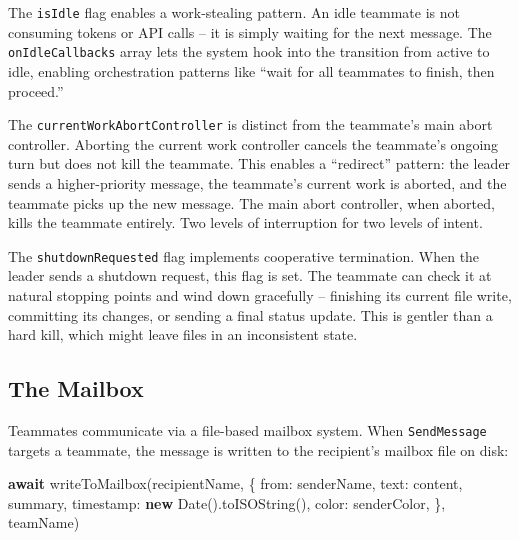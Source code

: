 \documentclass[
  english,
  11pt,
  letterpaper,
]{book}
\newenvironment{Shaded}{\begin{snugshade}}{\end{snugshade}}
\newcommand{\BuiltInTok}[1]{\textcolor[rgb]{0.00,0.23,0.31}{#1}}
\newcommand{\ControlFlowTok}[1]{\textcolor[rgb]{0.00,0.23,0.31}{\textbf{#1}}}
\newcommand{\FunctionTok}[1]{\textcolor[rgb]{0.28,0.35,0.67}{#1}}
\newcommand{\KeywordTok}[1]{\textcolor[rgb]{0.00,0.23,0.31}{\textbf{#1}}}
\newcommand{\NormalTok}[1]{\textcolor[rgb]{0.00,0.23,0.31}{#1}}
\newcommand{\OperatorTok}[1]{\textcolor[rgb]{0.37,0.37,0.37}{#1}}
\begin{document}
The \texttt{isIdle} flag enables a work-stealing pattern. An idle
teammate is not consuming tokens or API calls -- it is simply waiting
for the next message. The \texttt{onIdleCallbacks} array lets the system
hook into the transition from active to idle, enabling orchestration
patterns like ``wait for all teammates to finish, then proceed.''

The \texttt{currentWorkAbortController} is distinct from the teammate's
main abort controller. Aborting the current work controller cancels the
teammate's ongoing turn but does not kill the teammate. This enables a
``redirect'' pattern: the leader sends a higher-priority message, the
teammate's current work is aborted, and the teammate picks up the new
message. The main abort controller, when aborted, kills the teammate
entirely. Two levels of interruption for two levels of intent.

The \texttt{shutdownRequested} flag implements cooperative termination.
When the leader sends a shutdown request, this flag is set. The teammate
can check it at natural stopping points and wind down gracefully --
finishing its current file write, committing its changes, or sending a
final status update. This is gentler than a hard kill, which might leave
files in an inconsistent state.

\subsection{The Mailbox}\label{the-mailbox}

Teammates communicate via a file-based mailbox system. When
\texttt{SendMessage} targets a teammate, the message is written to the
recipient's mailbox file on disk:

\begin{Shaded}
\begin{Highlighting}[]
\ControlFlowTok{await} \FunctionTok{writeToMailbox}\NormalTok{(recipientName}\OperatorTok{,}\NormalTok{ \{}
\NormalTok{  from}\OperatorTok{:}\NormalTok{ senderName}\OperatorTok{,}
\NormalTok{  text}\OperatorTok{:}\NormalTok{ content}\OperatorTok{,}
\NormalTok{  summary}\OperatorTok{,}
\NormalTok{  timestamp}\OperatorTok{:} \KeywordTok{new} \BuiltInTok{Date}\NormalTok{()}\OperatorTok{.}\FunctionTok{toISOString}\NormalTok{()}\OperatorTok{,}
\NormalTok{  color}\OperatorTok{:}\NormalTok{ senderColor}\OperatorTok{,}
\NormalTok{\}}\OperatorTok{,}\NormalTok{ teamName)}
\end{Highlighting}
\end{Shaded}
\end{document}
